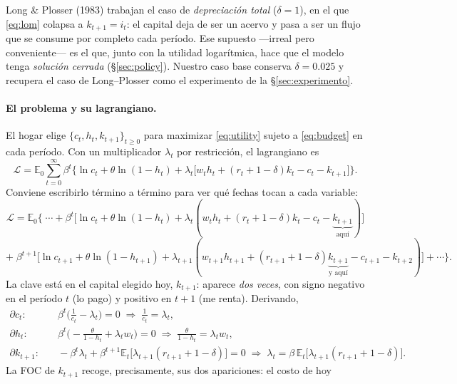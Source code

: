 \documentclass[11pt,a4paper]{report}
\newcounter{tcbrem}[section]
\renewcommand{\thetcbrem}{\thesection.\arabic{tcbrem}}
\newenvironment{remark}{%
  \refstepcounter{tcbrem}%
  \begin{tcolorbox}[remarkstyle, title={Observación~\thetcbrem}]}%
{\end{tcolorbox}}
\newcommand{\E}{\mathbb{E}}
\begin{document}
\begin{remark}
Long \& Plosser (1983) trabajan el caso de \emph{depreciación total} ($\delta=1$), en
el que \eqref{eq:lom} colapsa a $k_{t+1}=i_t$: el capital deja de ser un acervo y pasa
a ser un flujo que se consume por completo cada período. Ese supuesto ---irreal pero
conveniente--- es el que, junto con la utilidad logarítmica, hace que el modelo tenga
\emph{solución cerrada} (\S\ref{sec:policy}). Nuestro caso base conserva
$\delta=0.025$ y recupera el caso de Long--Plosser como el experimento de la
\S\ref{sec:experimento}.
\end{remark}

\paragraph{El problema y su lagrangiano.} El hogar elige $\{c_t,h_t,k_{t+1}\}_{t\ge0}$
para maximizar \eqref{eq:utility} sujeto a \eqref{eq:budget} en cada período. Con un
multiplicador $\lambda_t$ por restricción, el lagrangiano es
\begin{equation}
\mathcal{L}=\E_0\sum_{t=0}^\infty \beta^t\Big\{\ln c_t+\theta\ln(1-h_t)
+\lambda_t\big[w_t h_t+(r_t+1-\delta)k_t-c_t-k_{t+1}\big]\Big\}.
\label{eq:lagr}
\end{equation}
Conviene escribirlo término a término para ver qué fechas tocan a cada variable:
\[
\mathcal{L}=\E_0\Big\{\;\cdots
+\beta^{t}\big[\ln c_t+\theta\ln(1-h_t)+\lambda_t(w_t h_t+(r_t+1-\delta)k_t-c_t
-\underbrace{k_{t+1}}_{\text{aquí}})\big]
\]
\[
+\;\beta^{t+1}\big[\ln c_{t+1}+\theta\ln(1-h_{t+1})+\lambda_{t+1}(w_{t+1}h_{t+1}
+(r_{t+1}+1-\delta)\underbrace{k_{t+1}}_{\text{y aquí}}-c_{t+1}-k_{t+2})\big]
+\cdots\Big\}.
\]
La clave está en el capital elegido hoy, $k_{t+1}$: aparece \emph{dos veces}, con signo
negativo en el período $t$ (lo pago) y positivo en $t+1$ (me renta). Derivando,
\begin{align}
\partial c_t:&\quad \beta^t\big(\tfrac{1}{c_t}-\lambda_t\big)=0
  \;\Rightarrow\; \tfrac{1}{c_t}=\lambda_t, \label{eq:foc_c}\\[2pt]
\partial h_t:&\quad \beta^t\big(-\tfrac{\theta}{1-h_t}+\lambda_t w_t\big)=0
  \;\Rightarrow\; \tfrac{\theta}{1-h_t}=\lambda_t w_t, \label{eq:foc_h}\\[2pt]
\partial k_{t+1}:&\quad -\beta^t\lambda_t+\beta^{t+1}\E_t\!\big[\lambda_{t+1}(r_{t+1}+1-\delta)\big]=0
  \;\Rightarrow\; \lambda_t=\beta\,\E_t\!\big[\lambda_{t+1}(r_{t+1}+1-\delta)\big]. \label{eq:foc_k}
\end{align}
La FOC de $k_{t+1}$ recoge, precisamente, sus dos apariciones: el costo de hoy
\end{document}
